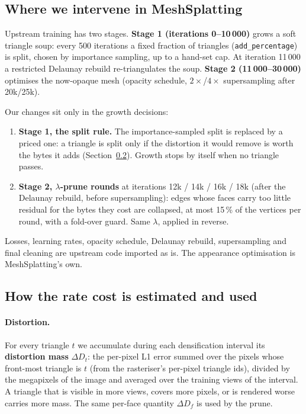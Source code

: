 \documentclass[11pt,a4paper]{article}
\begin{document}
\subsection{Where we intervene in MeshSplatting}

Upstream training has two stages. \textbf{Stage 1 (iterations 0--10\,000)} grows a soft triangle soup: every 500 iterations a fixed fraction of triangles (\texttt{add\_percentage}) is split, chosen by importance sampling, up to a hand-set cap. At iteration 11\,000 a restricted Delaunay rebuild re-triangulates the soup. \textbf{Stage 2 (11\,000--30\,000)} optimises the now-opaque mesh (opacity schedule, $2\times$/$4\times$ supersampling after 20k/25k).

Our changes sit only in the growth decisions:
\begin{enumerate}[nosep,leftmargin=*]
  \item \textbf{Stage 1, the split rule.} The importance-sampled split is replaced by a priced one: a triangle is split only if the distortion it would remove is worth the bytes it adds (Section~\ref{sec:rate}). Growth stops by itself when no triangle passes.
  \item \textbf{Stage 2, $\lambda$-prune rounds} at iterations 12k / 14k / 16k / 18k (after the Delaunay rebuild, before supersampling): edges whose faces carry too little residual for the bytes they cost are collapsed, at most 15\,\% of the vertices per round, with a fold-over guard. Same $\lambda$, applied in reverse.
\end{enumerate}
Losses, learning rates, opacity schedule, Delaunay rebuild, supersampling and final cleaning are upstream code imported as is. The appearance optimisation is MeshSplatting's own.

\subsection{How the rate cost is estimated and used}
\label{sec:rate}

\paragraph{Distortion.} For every triangle $t$ we accumulate during each densification interval its \textbf{distortion mass} $\Delta D_t$: the per-pixel L1 error summed over the pixels whose front-most triangle is $t$ (from the rasteriser's per-pixel triangle ids), divided by the megapixels of the image and averaged over the training views of the interval. A triangle that is visible in more views, covers more pixels, or is rendered worse carries more mass. The same per-face quantity $\Delta D_f$ is used by the prune.
\end{document}
